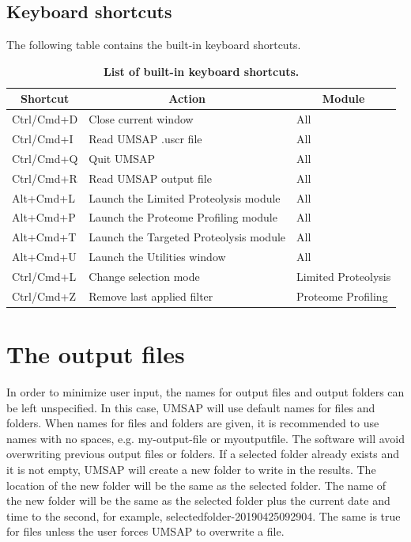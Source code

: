 \subsection{Keyboard shortcuts}

The following table contains the built-in keyboard shortcuts.

\begin{table}[h!]
	\centering
	\begin{tabular}{l l l}
		\hline
		\multicolumn{1}{c}{Shortcut} & \multicolumn{1}{c}{Action} & \multicolumn{1}{c}{Module} \\
		\hline
		Ctrl/Cmd+D & Close current window & All \\		
		Ctrl/Cmd+I  & Read UMSAP .uscr file & All \\		
		Ctrl/Cmd+Q & Quit UMSAP                & All \\
		Ctrl/Cmd+R & Read UMSAP output file  & All \\		
		Alt+Cmd+L & Launch the Limited Proteolysis module & All \\
		Alt+Cmd+P & Launch the Proteome Profiling module  & All \\
		Alt+Cmd+T & Launch the Targeted Proteolysis module & All \\
		Alt+Cmd+U & Launch the Utilities window & All \\		
		Ctrl/Cmd+L & Change selection mode & Limited Proteolysis \\								
		Ctrl/Cmd+Z & Remove last applied filter & Proteome Profiling \\
		\hline		
	\end{tabular}
	\caption[List of built-in keyboard shortcuts]{\textbf{List of built-in keyboard shortcuts.}}
	\label{table:shortcuts}
\end{table}

\section{The output files}

In order to minimize user input, the names for output files and output folders can be left unspecified. In this case, UMSAP will use default names for files and folders. When names for files and folders are given, it is recommended to use names with no spaces, e.g. my-output-file or myoutputfile. The software will avoid overwriting previous output files or folders. If a selected folder already exists and it is not empty, UMSAP will create a new folder to write in the results. The location of the new folder will be the same as the selected folder. The name of the new folder will be the same as the selected folder plus the current date and time to the second, for example, selectedfolder-20190425092904. The same is true for files unless the user forces UMSAP to overwrite a file. 

